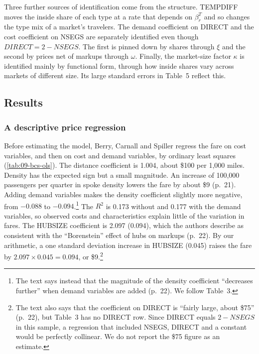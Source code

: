 Three further sources of identification come from the structure. TEMPDIFF moves the inside share of each type
at a rate that depends on $\beta^T_r$ and so changes the type mix of a market's travelers. The demand
coefficient on DIRECT and the cost coefficient on NSEGS are separately identified even though
$\mathit{DIRECT}=2-\mathit{NSEGS}$. The first is pinned down by shares through $\xi$ and the second by prices
net of markups through $\omega$. Finally, the market-size factor $\kappa$ is identified mainly by functional
form, through how inside shares vary across markets of different size. Its large standard errors in
Table~5 reflect this.

\subsection{Results}\label{sec:09-bcs-results}

\subsubsection{A descriptive price regression}

Before estimating the model, Berry, Carnall and Spiller regress the fare on cost variables, and then on cost
and demand variables, by ordinary least squares (\cref{tab:09-bcs-ols}). The distance coefficient is 1.004,
about \$100 per 1,000 miles. Density has the expected sign but a small magnitude. An increase of 100,000
passengers per quarter in spoke density lowers the fare by about \$9 (p.~21). Adding demand variables makes
the density coefficient slightly more negative, from $-0.088$ to $-0.094$.\footnote{The text says instead that
the magnitude of the density coefficient ``decreases further'' when demand variables are added (p.~22). We
follow Table~3.} The $R^2$ is 0.173 without and 0.177 with the
demand variables, so observed costs and characteristics explain little of the variation in fares. The
HUBSIZE coefficient is 2.097 (0.094), which the authors describe as consistent with the ``Borenstein''
effect of hubs on markups (p.~22). By our arithmetic, a one standard deviation increase in HUBSIZE (0.045)
raises the fare by $2.097\times0.045=0.094$, or \$9.\footnote{The text also says that the coefficient on
DIRECT is ``fairly large, about \$75'' (p.~22), but Table~3 has no DIRECT row. Since DIRECT equals
$2-\mathit{NSEGS}$ in this sample, a regression that included NSEGS, DIRECT and a constant would be
perfectly collinear. We do not report the \$75 figure as an estimate.}

